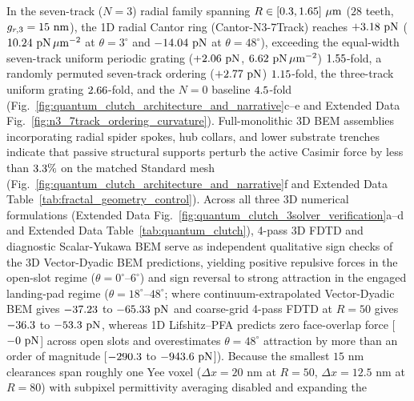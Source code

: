 \documentclass[pdflatex,sn-nature]{sn-jnl}
\DeclareRobustCommand{\roundone}[1]{\fpeval{round(#1,1)}}
\DeclareRobustCommand{\roundtwo}[1]{\fpeval{round(#1,2)}}
\begin{document}
In the seven-track ($N=3$) radial family spanning $R \in [0.3{}, 1.65{}]\ \mu\text{m}$ ($28$ teeth, $g_{r,3} = 15{}\text{ nm}$), the 1D radial Cantor ring (Cantor-N3-7Track) reaches $+\roundtwo{\FractalNthreeCantorseventrackBemThetathreeFZPn}\text{ pN}$ ($\roundtwo{\NatureFractalNthreeCantorseventrackFRepPnPerToothAreaUmtwo}\text{ pN}\,\mu\text{m}^{-2}$ at $\theta=3^\circ$ and $\roundtwo{\FractalNthreeCantorseventrackBemThetafoureightFZPn}\text{ pN}$ at $\theta=48^\circ$), exceeding the equal-width seven-track uniform periodic grating ($+\roundtwo{\NthreeCurvCylUniformFzPn}\text{ pN}$, $\roundtwo{\NthreeUnithreedCtrlUnizerozerozeroFa}\text{ pN}\,\mu\text{m}^{-2}$) $\roundtwo{\fpeval{\FractalNthreeCantorseventrackBemThetathreeFZPn/\NthreeCurvCylUniformFzPn}}$-fold, a randomly permuted seven-track ordering ($+\roundtwo{\NthreeCurvCylShuffledFzPn}\text{ pN}$) $\roundtwo{\fpeval{\FractalNthreeCantorseventrackBemThetathreeFZPn/\NthreeCurvCylShuffledFzPn}}$-fold, the three-track uniform grating $2.66{}$-fold, and the $N=0$ baseline $4.5{}$-fold (Fig.~\ref{fig:quantum_clutch_architecture_and_narrative}c--e and Extended Data Fig.~\ref{fig:n3_7track_ordering_curvature}). Full-monolithic 3D BEM assemblies incorporating radial spider spokes, hub collars, and lower substrate trenches indicate that passive structural supports perturb the active Casimir force by less than $\roundone{\fpeval{100*abs(\CantorNtwoHybridrzBemMonolithicThetathreeFZPn-\CantorNtwoHybridrzBemStdFZPn)/\CantorNtwoHybridrzBemStdFZPn}}\%$ on the matched Standard mesh (Fig.~\ref{fig:quantum_clutch_architecture_and_narrative}f and Extended Data Table~\ref{tab:fractal_geometry_control}). Across all three 3D numerical formulations (Extended Data Fig.~\ref{fig:quantum_clutch_3solver_verification}a--d and Extended Data Table~\ref{tab:quantum_clutch}), 4-pass 3D FDTD and diagnostic Scalar-Yukawa BEM serve as independent qualitative sign checks of the 3D Vector-Dyadic BEM predictions, yielding positive repulsive forces in the open-slot regime ($\theta = 0^\circ\text{--}6^\circ$) and sign reversal to strong attraction in the engaged landing-pad regime ($\theta = 18^\circ\text{--}48^\circ$; where continuum-extrapolated Vector-Dyadic BEM gives $\roundtwo{\RotCeightCompactNtwoBemThetafoureightContinuumFZPn}$ to $\roundtwo{\RotCfourTightslotNtwoBemThetafoureightRichardsonFZPn}\text{ pN}$ and coarse-grid 4-pass FDTD at $R=50$ gives $\roundtwo{\RotCeightCompactNtwoMeepThetafoureightFZPn}$ to $\roundtwo{\RotCfourTightslotNtwoMeepThetafoureightFZPn}\text{ pN}$, whereas 1D Lifshitz--PFA predicts zero face-overlap force [$-0{}\text{ pN}$] across open slots and overestimates $\theta=48^\circ$ attraction by more than an order of magnitude [$\roundone{\RotCeightCompactNtwoHighThetaZerofoureightpzeroLifshitzPfaFZPn}$ to $\roundone{\RotCfourTightslotNtwoHighThetaZerofoureightpzeroLifshitzPfaFZPn}\text{ pN}$]). Because the smallest $15\text{ nm}$ clearances span roughly one Yee voxel ($\Delta x = 20\text{ nm}$ at $R=50$, $\Delta x = 12.5\text{ nm}$ at $R=80$) with subpixel permittivity averaging disabled and expanding the 
\end{document}
